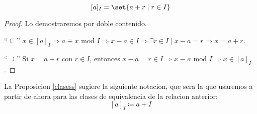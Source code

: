 \begin{proposition}
	\label{clasess}
	\[
		[a]_I =  \set{a + r \mid r \in I }
	\]
\end{proposition}
\begin{proof}
	Lo demostraremos por doble contenido.
	
	``\(\subseteq \)'' \(x \in [a]_I \Rightarrow a \equiv x \text{ mod } I \Rightarrow x - a \in I \Rightarrow \exists r \in I \mid x - a = r \Rightarrow x = a + r \).
	
	``\(\supseteq \)'' Si \(x = a + r \) con \(r \in I \), entonces \(x - a = r \in I \Rightarrow x \equiv a \text{ mod } I \Rightarrow x \in [a]_I \).
\end{proof}
La Proposicion \ref{clasess} sugiere la siguiente notacion, que sera la que usaremos a partir de ahora para las clases de equivalencia de la relacion anterior:
\[
	[a]_I \coloneqq  a + I
\]

